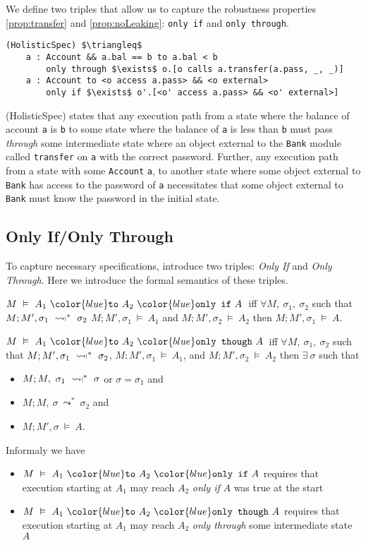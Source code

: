 \documentclass[acmsmall,review,anonymous]{acmart}\settopmatter{printfolios=true,printccs=false,printacmref=false}
\newcommand{\constrained}{\mathrel{\leadsto\ \!\!\!\!{\raisebox{1pt}{$\mathsmaller{\mathsmaller{\mathsmaller{\mathsmaller\rvert}}}$}}}}
\newcommand\onlyIf[3]{#1\ {\color{blue}\texttt{to}}\ #2\ {\color{blue}\texttt{only if}}\ #3}
\newcommand\onlyThrough[3]{#1\ {\color{blue}\texttt{to}}\ #2\ {\color{blue}\texttt{only though}}\ #3}
\begin{document}
We define two triples that allow us to
capture the robustness properties \ref{prop:transfer} and \ref{prop:noLeaking}: \texttt{only if}
and \texttt{only through}.
\begin{lstlisting}[mathescape=true]
(HolisticSpec) $\triangleq$
	a : Account && a.bal == b to a.bal < b 
		only through $\exists$ o.[o calls a.transfer(a.pass, _, _)]
	a : Account to <o access a.pass> && <o external> 
		only if $\exists$ o'.[<o' access a.pass> && <o' external>]
\end{lstlisting}
(HolisticSpec) states that any execution path from a state where the balance of account \texttt{a}
is \texttt{b} to some state where the balance of \texttt{a} is less than \texttt{b} 
must pass \emph{through} some intermediate state where an object external to the \texttt{Bank} module 
called \texttt{transfer} on \texttt{a} with the correct password. Further, any execution
path from a state with some \texttt{Account} \texttt{a}, to another state where some object external 
to \texttt{Bank} has access to the password of \texttt{a} necessitates that some object external to 
\texttt{Bank} must know the password in the initial state.


\subsection{Only If/Only Through}
To capture necessary specifications, introduce two triples: \emph{Only If} and \emph{Only Through}.
Here we introduce the formal semantics of these triples.
\begin{definition}[Only If]
$M\ \vDash\ \onlyIf{A_1}{A_2}{A}$\ iff 
$\forall M,\ \sigma_1,\ \sigma_2$ such that 
$M; M', \sigma_1\ \constrained^*\ \sigma_2$
$M; M', \sigma_1\ \vDash\ A_1$ and 
$M; M', \sigma_2\ \vDash\ A_2$ then
$M; M', \sigma_1\ \vDash\ A$.
\end{definition}
\begin{definition}
$M\ \vDash\ \onlyThrough{A_1}{A_2}{A}$\ iff 
$\forall M,\ \sigma_1,\ \sigma_2$ such that 
$M; M', \sigma_1\ \constrained^*\ \sigma_2$, 
$M; M', \sigma_1\ \vDash\ A_1$, and 
$M; M', \sigma_2\ \vDash\ A_2$ then
$\exists\ \sigma$ such that 
\begin{itemize}
\item
$M; M,\ \sigma_1\ \constrained^*\ \sigma$ or $\sigma = \sigma_1$ and
\item
$M; M,\ \sigma\ \leadsto^*\ \sigma_2$ and 
\item
$M; M', \sigma\ \vDash\ A$.
\end{itemize}
\end{definition}
Informaly we have 
\begin{itemize}
\item
$M\ \vDash\ \onlyIf{A_1}{A_2}{A}$ requires that execution starting at $A_1$ may reach $A_2$ \emph{only if} $A$ was true at the start
\item
$M\ \vDash\ \onlyThrough{A_1}{A_2}{A}$ requires that execution starting at $A_1$ may reach $A_2$ \emph{only through} some intermediate state $A$
\end{itemize}
\end{document}
